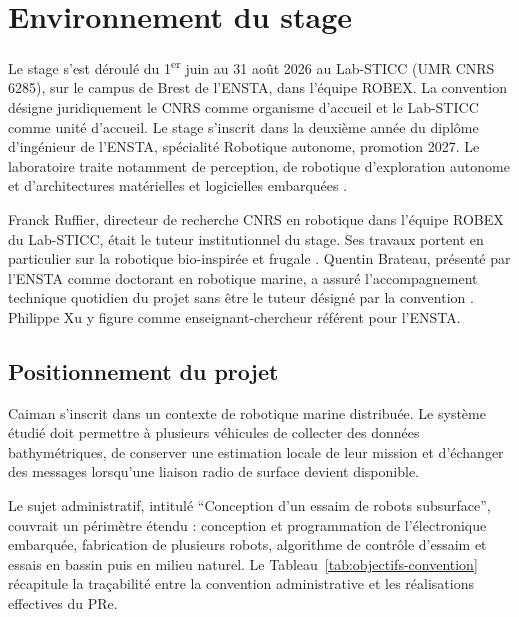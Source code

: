 \chapter{Environnement du stage}
\label{chap:contexte}

Le stage s'est déroulé du 1\textsuperscript{er} juin au 31 août 2026 au Lab-STICC (UMR CNRS 6285), sur le campus de Brest de l'ENSTA, dans l'équipe ROBEX. La convention désigne juridiquement le CNRS comme organisme d'accueil et le Lab-STICC comme unité d'accueil. Le stage s'inscrit dans la deuxième année du diplôme d'ingénieur de l'ENSTA, spécialité Robotique autonome, promotion 2027. Le laboratoire traite notamment de perception, de robotique d'exploration autonome et d'architectures matérielles et logicielles embarquées \cite{ensta-laboratories}.

Franck Ruffier, directeur de recherche CNRS en robotique dans l'équipe ROBEX du Lab-STICC, était le tuteur institutionnel du stage. Ses travaux portent en particulier sur la robotique bio-inspirée et frugale \cite{ensta-ruffier}. Quentin Brateau, présenté par l'ENSTA comme doctorant en robotique marine, a assuré l'accompagnement technique quotidien du projet sans être le tuteur désigné par la convention \cite{ensta-robotique-autonome}. Philippe Xu y figure comme enseignant-chercheur référent pour l'ENSTA.

\section{Positionnement du projet}

Caiman s'inscrit dans un contexte de robotique marine distribuée. Le système étudié doit permettre à plusieurs véhicules de collecter des données bathymétriques, de conserver une estimation locale de leur mission et d'échanger des messages lorsqu'une liaison radio de surface devient disponible.

Le sujet administratif, intitulé \enquote{Conception d'un essaim de robots subsurface}, couvrait un périmètre étendu : conception et programmation de l'électronique embarquée, fabrication de plusieurs robots, algorithme de contrôle d'essaim et essais en bassin puis en milieu naturel. Le Tableau~\ref{tab:objectifs-convention} récapitule la traçabilité entre la convention administrative et les réalisations effectives du PRe.

